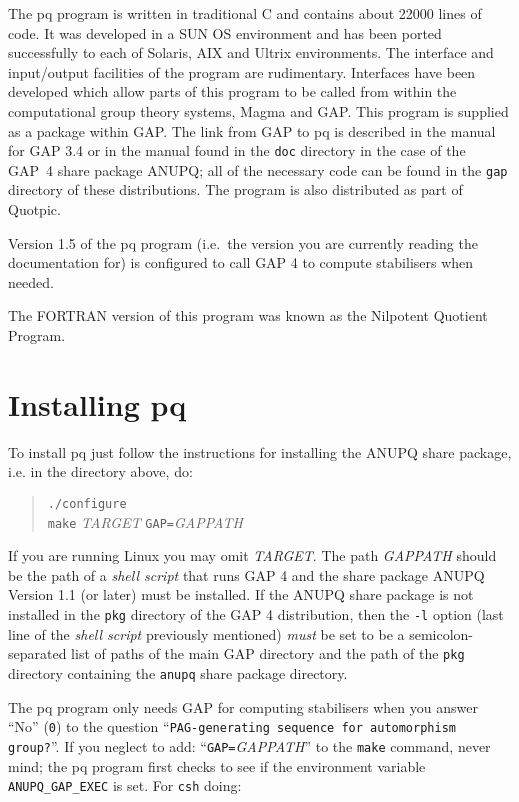 \documentclass[12pt]{article}
\begin{document}
The pq program is written in traditional C and contains about 
22000 lines of code.
It was developed in a SUN OS environment and has been ported successfully
to each of Solaris, AIX and Ultrix environments.  The interface and 
input/output facilities of the program are rudimentary.  Interfaces 
have been developed which allow parts of this program to be called
from within the computational group theory systems, 
{\sc Magma} and {\sf GAP}.  
This program is supplied as a package within {\sf GAP}.
The link from {\sf GAP} to pq is described in the manual
for {\sf GAP} 3.4 or in the manual found in the \texttt{doc} directory
in the case of the {\sf GAP}~4 share package {\sf ANUPQ}; all of the 
necessary code can be found in the \texttt{gap} directory of these 
distributions.
The program is also distributed as part of Quotpic.

Version 1.5 of the pq program (i.e.~the version you are currently reading
the documentation for) is configured to call {\sf GAP} 4 to compute
stabilisers when needed.

The FORTRAN version of this program was known as the 
Nilpotent Quotient Program.

\section{Installing pq}\label{sec:pq-install}

To install pq just follow the instructions for installing the {\sf ANUPQ}
share package, i.e. in the directory above, do:

\begin{quote}
\verb|./configure|\\
\verb|make| \textit{TARGET} \verb|GAP=|\textit{GAPPATH}
\end{quote}

If you are running Linux you may omit \textit{TARGET}. The path 
\textit{GAPPATH} should be the path of a \emph{shell script} that runs
{\sf GAP} 4 and the share package {\sf ANUPQ} Version 1.1 (or later)
must be installed. If the {\sf ANUPQ} share package is not installed
in the \texttt{pkg} directory of the {\sf GAP} 4 distribution, then
the \texttt{-l} option (last line of the \emph{shell script} previously
mentioned) \emph{must} be set to be a semicolon-separated list of
paths of the main {\sf GAP} directory and the path of the \texttt{pkg}
directory containing the \texttt{anupq} share package directory.

The pq program only needs {\sf GAP} for computing stabilisers when you
answer ``No'' (\texttt{0}) to the question 
``\texttt{PAG-generating sequence for automorphism group?}''.
If you neglect to add: ``\verb|GAP=|\textit{GAPPATH}'' to the \verb|make|
command, never mind; the pq program first checks to see if the environment
variable \verb|ANUPQ_GAP_EXEC| is set. For \texttt{csh} doing:
\end{document}
